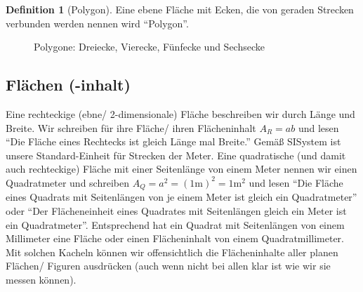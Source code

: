\documentclass[a4paper]{book}%
\theoremstyle{definition}
\newtheorem{definition}{Definition}
\begin{document}
\begin{definition}[Polygon]
    Eine ebene Fläche mit Ecken, die von geraden Strecken verbunden werden nennen wird \enquote{Polygon}.
\end{definition}

\begin{figure}
  \centering
  \caption{Polygone: Dreiecke, Vierecke, Fünfecke und Sechsecke}\label{fig:Polygone}
\end{figure}



\subsection{Flächen (-inhalt)}

Eine rechteckige (ebne/ 2-dimensionale) Fläche beschreiben wir durch Länge und Breite. Wir schreiben für ihre Fläche/ ihren Flächeninhalt $A_R = a b$ und lesen \enquote{Die Fläche eines Rechtecks ist gleich Länge mal Breite.} Gemäß \gls{SISystem} ist unsere Standard-Einheit für Strecken der Meter. Eine quadratische (und damit auch rechteckige) Fläche mit einer Seitenlänge von einem Meter nennen wir einen Quadratmeter und schreiben $A_Q = a^2 = (1\text{m})^2 = 1\text{m}^2$ und lesen \enquote{Die Fläche eines Quadrats mit Seitenlängen von je einem Meter ist gleich ein Quadratmeter} oder \enquote{Der Flächeneinheit eines Quadrates mit Seitenlängen gleich ein Meter ist ein Quadratmeter}. Entsprechend hat ein Quadrat mit Seitenlängen von einem Millimeter eine Fläche oder einen Flächeninhalt von einem Quadratmillimeter. Mit solchen Kacheln können wir offensichtlich die Flächeninhalte aller planen Flächen/ Figuren ausdrücken (auch wenn nicht bei allen klar ist wie wir sie messen können).
\end{document}
